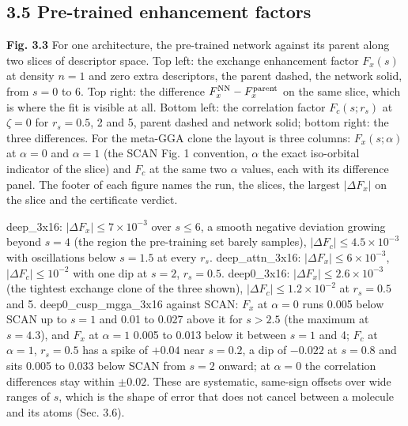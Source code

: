 \documentclass[10pt,a4paper]{article}
\begin{document}
\subsection*{3.5 Pre-trained enhancement factors}

\textbf{Fig. 3.3} For one architecture, the pre-trained network against its parent along two slices of descriptor space. Top left: the exchange enhancement factor $F_x(s)$ at density $n = 1$ and zero extra descriptors, the parent dashed, the network solid, from $s = 0$ to 6. Top right: the difference $F_x^{\rm NN} - F_x^{\rm parent}$ on the same slice, which is where the fit is visible at all. Bottom left: the correlation factor $F_c(s; r_s)$ at $\zeta = 0$ for $r_s = 0.5$, 2 and 5, parent dashed and network solid; bottom right: the three differences. For the meta-GGA clone the layout is three columns: $F_x(s; \alpha)$ at $\alpha = 0$ and $\alpha = 1$ (the SCAN Fig. 1 convention, $\alpha$ the exact iso-orbital indicator of the slice) and $F_c$ at the same two $\alpha$ values, each with its difference panel. The footer of each figure names the run, the slices, the largest $|\Delta F_x|$ on the slice and the certificate verdict.

deep\_3x16: $|\Delta F_x| \le 7 \times 10^{-3}$ over $s \le 6$, a smooth negative deviation growing beyond $s = 4$ (the region the pre-training set barely samples), $|\Delta F_c| \le 4.5 \times 10^{-3}$ with oscillations below $s = 1.5$ at every $r_s$. deep\_attn\_3x16: $|\Delta F_x| \le 6 \times 10^{-3}$, $|\Delta F_c| \le 10^{-2}$ with one dip at $s = 2$, $r_s = 0.5$. deep0\_3x16: $|\Delta F_x| \le 2.6 \times 10^{-3}$ (the tightest exchange clone of the three shown), $|\Delta F_c| \le 1.2 \times 10^{-2}$ at $r_s = 0.5$ and 5. deep0\_cusp\_mgga\_3x16 against SCAN: $F_x$ at $\alpha = 0$ runs 0.005 below SCAN up to $s = 1$ and 0.01 to 0.027 above it for $s > 2.5$ (the maximum at $s = 4.3$), and $F_x$ at $\alpha = 1$ 0.005 to 0.013 below it between $s = 1$ and 4; $F_c$ at $\alpha = 1$, $r_s = 0.5$ has a spike of $+0.04$ near $s = 0.2$, a dip of $-0.022$ at $s = 0.8$ and sits 0.005 to 0.033 below SCAN from $s = 2$ onward; at $\alpha = 0$ the correlation differences stay within $\pm 0.02$. These are systematic, same-sign offsets over wide ranges of $s$, which is the shape of error that does not cancel between a molecule and its atoms (Sec. 3.6).
\end{document}
